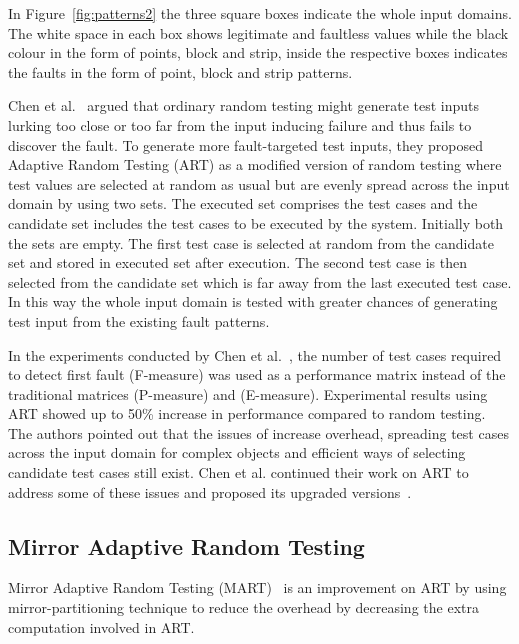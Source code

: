 In Figure~\ref{fig:patterns2} the three square boxes indicate the whole input domains. The white space in each box shows legitimate and faultless values while the black colour in the form of points, block and strip, inside the respective boxes indicates the faults in the form of point, block and strip patterns.

Chen et al.~\cite{Chen2008} argued that ordinary random testing might generate test inputs lurking too close or too far from the input inducing failure and thus fails to discover the fault. To generate more fault-targeted test inputs, they proposed Adaptive Random Testing (ART) as a modified version of random testing where test values are selected at random as usual but are evenly spread across the input domain by using two sets. The executed set comprises the test cases and the candidate set includes the test cases to be executed by the system. Initially both the sets are empty. The first test case is selected at random from the candidate set and stored in executed set after execution. The second test case is then selected from the candidate set which is far away from the last executed test case. In this way the whole input domain is tested with greater chances of generating test input from the existing fault patterns.

In the experiments conducted by Chen et al.~\cite{Chen2008}, the number of test cases required to detect first fault (F-measure) was used as a performance matrix instead of the traditional matrices (P-measure) and (E-measure). Experimental results using ART showed up to 50\% increase in performance compared to random testing. The authors pointed out that the issues of increase overhead, spreading test cases across the input domain for complex objects and efficient ways of selecting candidate test cases still exist. Chen et al. continued their work on ART to address some of these issues and proposed its upgraded versions~\cite{Chen2005, chen2009enhanced}. 

\subsection{Mirror Adaptive Random Testing}
Mirror Adaptive Random Testing (MART)~\cite{Chen2003} is an improvement on ART by using mirror-partitioning technique to reduce the overhead by decreasing the extra computation involved in ART. 

